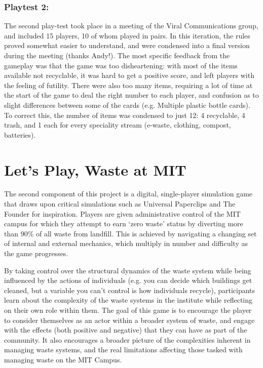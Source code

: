 \documentclass[nofonts,nols,justified,nobib]{tufte-book}
\begin{document}
\subsubsection*{Playtest 2:}
The second play-test took place in a meeting of the Viral Communications group, and included 15 players, 10 of whom played in pairs. In this iteration, the rules proved somewhat easier to understand, and were condensed into a final version during the meeting (thanks Andy!).
The most specific feedback from the gameplay was that the game was too disheartening: with most of the items available not recyclable, it was hard to get a positive score, and left players with the feeling of futility. There were also too many items, requiring a lot of time at the start of the game to deal the right number to each player, and confusion as to slight differences between some of the cards (e.g. Multiple plastic bottle cards). To correct this, the number of items was condensed to just 12: 4 recyclable, 4 trash, and 1 each for every speciality stream (e-waste, clothing, compost, batteries).


\section*{Let's Play, Waste at MIT}

The second component of this project is a digital, single-player simulation game that draws upon critical simulations such as Universal Paperclips and The Founder for inspiration. Players are given administrative control of the MIT campus for which they attempt to earn `zero waste' status by diverting more than 90\% of all waste from landfill. This is achieved by navigating a changing set of internal and external mechanics, which multiply in number and difficulty as the game progresses.

By taking control over the structural dynamics of the waste system while being influenced by the actions of individuals (e.g. you can decide which buildings get cleaned, but a variable you can't control is how individuals recycle), participants learn about the complexity of the waste systems in the institute while reflecting on their own role within them. The goal of this game is to encourage the player to consider themselves as an actor within a broader system of waste, and engage with the effects (both positive and negative) that they can have as part of the community. It also encourages a broader picture of the complexities inherent in managing waste systems, and the real limitations affecting those tasked with managing waste on the MIT Campus.
\end{document}
